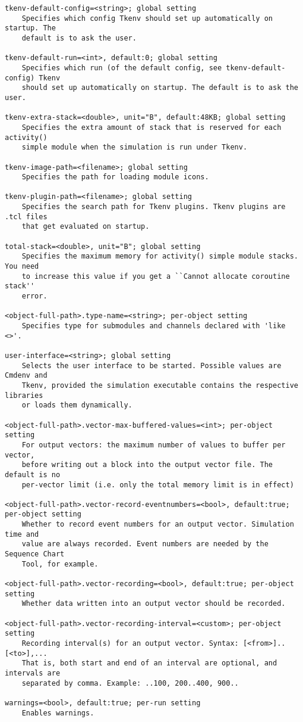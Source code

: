 \begin{verbatim}
tkenv-default-config=<string>; global setting
    Specifies which config Tkenv should set up automatically on startup. The
    default is to ask the user.

tkenv-default-run=<int>, default:0; global setting
    Specifies which run (of the default config, see tkenv-default-config) Tkenv
    should set up automatically on startup. The default is to ask the user.

tkenv-extra-stack=<double>, unit="B", default:48KB; global setting
    Specifies the extra amount of stack that is reserved for each activity()
    simple module when the simulation is run under Tkenv.

tkenv-image-path=<filename>; global setting
    Specifies the path for loading module icons.

tkenv-plugin-path=<filename>; global setting
    Specifies the search path for Tkenv plugins. Tkenv plugins are .tcl files
    that get evaluated on startup.

total-stack=<double>, unit="B"; global setting
    Specifies the maximum memory for activity() simple module stacks. You need
    to increase this value if you get a ``Cannot allocate coroutine stack''
    error.

<object-full-path>.type-name=<string>; per-object setting
    Specifies type for submodules and channels declared with 'like <>'.

user-interface=<string>; global setting
    Selects the user interface to be started. Possible values are Cmdenv and
    Tkenv, provided the simulation executable contains the respective libraries
    or loads them dynamically.

<object-full-path>.vector-max-buffered-values=<int>; per-object setting
    For output vectors: the maximum number of values to buffer per vector,
    before writing out a block into the output vector file. The default is no
    per-vector limit (i.e. only the total memory limit is in effect)

<object-full-path>.vector-record-eventnumbers=<bool>, default:true; per-object setting
    Whether to record event numbers for an output vector. Simulation time and
    value are always recorded. Event numbers are needed by the Sequence Chart
    Tool, for example.

<object-full-path>.vector-recording=<bool>, default:true; per-object setting
    Whether data written into an output vector should be recorded.

<object-full-path>.vector-recording-interval=<custom>; per-object setting
    Recording interval(s) for an output vector. Syntax: [<from>]..[<to>],...
    That is, both start and end of an interval are optional, and intervals are
    separated by comma. Example: ..100, 200..400, 900..

warnings=<bool>, default:true; per-run setting
    Enables warnings.
\end{verbatim}


